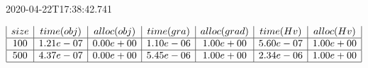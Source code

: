 

2020-04-22T17:38:42.741

\begin{equation} 
	\begin{array}{|c|c|c|c|c|c|c|}
		size         & time(obj)    & alloc(obj)   & time(gra)    & alloc(grad)  & time(Hv)     & alloc(Hv)    \\ \hline 
		100          & 1.21e-07     & 0.00e+00     & 1.10e-06     & 1.00e+00     & 5.60e-07     & 1.00e+00    \\ \hline 
		500          & 4.37e-07     & 0.00e+00     & 5.45e-06     & 1.00e+00     & 2.34e-06     & 1.00e+00    \\ \hline 
	\end{array} 
\end{equation}
